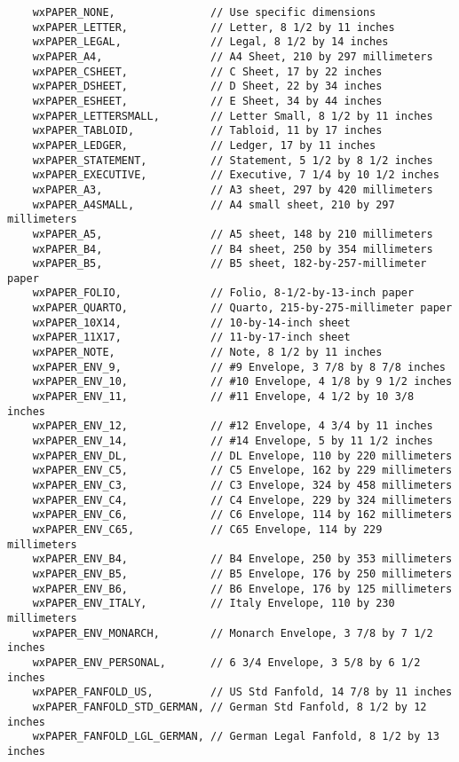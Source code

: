 {\small
\begin{verbatim}
    wxPAPER_NONE,               // Use specific dimensions
    wxPAPER_LETTER,             // Letter, 8 1/2 by 11 inches
    wxPAPER_LEGAL,              // Legal, 8 1/2 by 14 inches
    wxPAPER_A4,                 // A4 Sheet, 210 by 297 millimeters
    wxPAPER_CSHEET,             // C Sheet, 17 by 22 inches
    wxPAPER_DSHEET,             // D Sheet, 22 by 34 inches
    wxPAPER_ESHEET,             // E Sheet, 34 by 44 inches
    wxPAPER_LETTERSMALL,        // Letter Small, 8 1/2 by 11 inches
    wxPAPER_TABLOID,            // Tabloid, 11 by 17 inches
    wxPAPER_LEDGER,             // Ledger, 17 by 11 inches
    wxPAPER_STATEMENT,          // Statement, 5 1/2 by 8 1/2 inches
    wxPAPER_EXECUTIVE,          // Executive, 7 1/4 by 10 1/2 inches
    wxPAPER_A3,                 // A3 sheet, 297 by 420 millimeters
    wxPAPER_A4SMALL,            // A4 small sheet, 210 by 297 millimeters
    wxPAPER_A5,                 // A5 sheet, 148 by 210 millimeters
    wxPAPER_B4,                 // B4 sheet, 250 by 354 millimeters
    wxPAPER_B5,                 // B5 sheet, 182-by-257-millimeter paper
    wxPAPER_FOLIO,              // Folio, 8-1/2-by-13-inch paper
    wxPAPER_QUARTO,             // Quarto, 215-by-275-millimeter paper
    wxPAPER_10X14,              // 10-by-14-inch sheet
    wxPAPER_11X17,              // 11-by-17-inch sheet
    wxPAPER_NOTE,               // Note, 8 1/2 by 11 inches
    wxPAPER_ENV_9,              // #9 Envelope, 3 7/8 by 8 7/8 inches
    wxPAPER_ENV_10,             // #10 Envelope, 4 1/8 by 9 1/2 inches
    wxPAPER_ENV_11,             // #11 Envelope, 4 1/2 by 10 3/8 inches
    wxPAPER_ENV_12,             // #12 Envelope, 4 3/4 by 11 inches
    wxPAPER_ENV_14,             // #14 Envelope, 5 by 11 1/2 inches
    wxPAPER_ENV_DL,             // DL Envelope, 110 by 220 millimeters
    wxPAPER_ENV_C5,             // C5 Envelope, 162 by 229 millimeters
    wxPAPER_ENV_C3,             // C3 Envelope, 324 by 458 millimeters
    wxPAPER_ENV_C4,             // C4 Envelope, 229 by 324 millimeters
    wxPAPER_ENV_C6,             // C6 Envelope, 114 by 162 millimeters
    wxPAPER_ENV_C65,            // C65 Envelope, 114 by 229 millimeters
    wxPAPER_ENV_B4,             // B4 Envelope, 250 by 353 millimeters
    wxPAPER_ENV_B5,             // B5 Envelope, 176 by 250 millimeters
    wxPAPER_ENV_B6,             // B6 Envelope, 176 by 125 millimeters
    wxPAPER_ENV_ITALY,          // Italy Envelope, 110 by 230 millimeters
    wxPAPER_ENV_MONARCH,        // Monarch Envelope, 3 7/8 by 7 1/2 inches
    wxPAPER_ENV_PERSONAL,       // 6 3/4 Envelope, 3 5/8 by 6 1/2 inches
    wxPAPER_FANFOLD_US,         // US Std Fanfold, 14 7/8 by 11 inches
    wxPAPER_FANFOLD_STD_GERMAN, // German Std Fanfold, 8 1/2 by 12 inches
    wxPAPER_FANFOLD_LGL_GERMAN, // German Legal Fanfold, 8 1/2 by 13 inches


\end{verbatim}}
